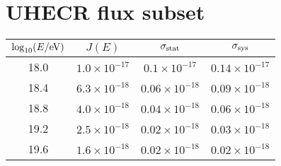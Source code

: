 \documentclass[%
 reprint,
 amsmath,amssymb,
 aps,
 pra,
 longbibliography,
 nofootinbib
]{revtex4-2}
\begin{document}
\section{UHECR flux subset}
\begin{table}[h]
\centering
\begin{tabular}{c c c c}
\toprule
$\log_{10}(E/{\rm eV})$ & $J(E)$ & $\sigma_{\rm stat}$ & $\sigma_{\rm sys}$ \\
\midrule
18.0 & $1.0\times10^{-17}$ & $0.1\times10^{-17}$ & $0.14\times10^{-17}$ \\
18.4 & $6.3\times10^{-18}$ & $0.06\times10^{-18}$ & $0.09\times10^{-18}$ \\
18.8 & $4.0\times10^{-18}$ & $0.04\times10^{-18}$ & $0.06\times10^{-18}$ \\
19.2 & $2.5\times10^{-18}$ & $0.02\times10^{-18}$ & $0.03\times10^{-18}$ \\
19.6 & $1.6\times10^{-18}$ & $0.02\times10^{-18}$ & $0.02\times10^{-18}$ \\
\bottomrule
\end{tabular}
\end{table}
\end{document}
